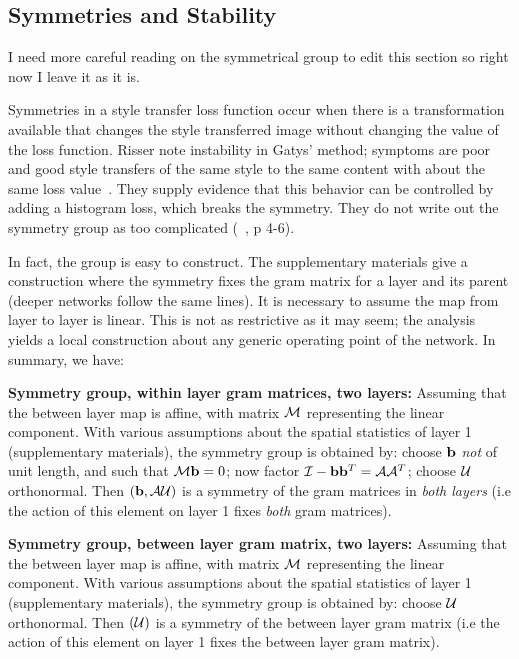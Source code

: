 \documentclass[runningheads]{llncs}
\newcommand{\vect}[1]{{\bf {#1}}}
\newcommand{\matx}[1]{{\cal {#1}}}
\begin{document}
\subsection{Symmetries and Stability}
 
 \todo I need more careful reading on the symmetrical group to edit this section so right now I leave it as it is.
 
Symmetries in a style transfer loss function occur when there is a transformation available that changes the style
transferred image without changing the value of the loss function.   Risser \ea note instability in Gatys' method;
symptoms are poor and good style transfers of the same style to the same content with about the same loss value~\cite{risser2017stable}.
They supply evidence that this behavior can be controlled by adding a histogram loss, which breaks the symmetry.
They do not write out the symmetry group as too complicated (~\cite{risser2017stable}, p 4-6).  

In fact, the group is easy to construct.  
The supplementary materials give a construction where the symmetry fixes the gram matrix for a layer and its parent
(deeper networks follow the same lines).  It is necessary to assume the map from layer to layer is linear.  This is not
as restrictive as it may seem; the analysis yields a local construction about any generic operating point of the
network.  In summary, we have:

{\bf Symmetry group, within layer gram matrices, two layers:}
Assuming that the between layer map is affine, with matrix $\matx{M}$
representing the linear component.  With various assumptions about the 
spatial statistics of layer 1 (supplementary materials), the symmetry
group is obtained by:  choose $\vect{b}$ {\em not} of unit length, and
such that $\matx{M}\vect{b}=0$; now factor
$\matx{I}-\vect{b}\vect{b}^T=\matx{A}\matx{A}^T$; choose $\matx{U}$
orthonormal.  Then $(\vect{b}, \matx{A}\matx{U})$ is a symmetry of the
gram matrices in {\em both layers} (i.e the action of this element on
layer 1 fixes {\em both} gram matrices).

{\bf Symmetry group, between layer gram matrix, two layers:}
Assuming that the between layer map is affine, with matrix $\matx{M}$
representing the linear component.  With various assumptions about the 
spatial statistics of layer 1 (supplementary materials), the symmetry
group is obtained by:  choose $\matx{U}$
orthonormal.  Then $(\matx{U})$ is a symmetry of the between layer
gram matrix (i.e the action of this element on layer 1 fixes the
between layer gram matrix).
\end{document}
